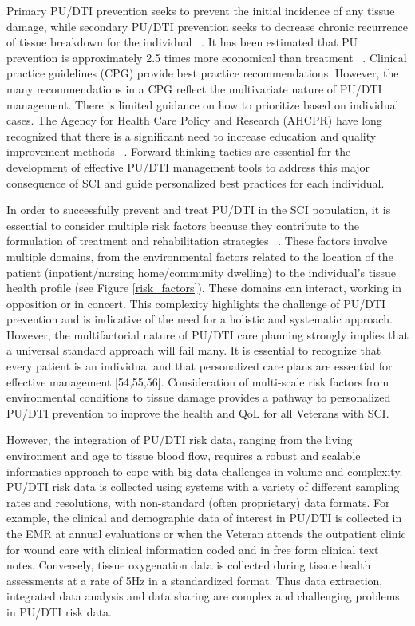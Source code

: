 \documentclass{amia}
\begin{document}
Primary PU/DTI prevention seeks to prevent the initial incidence of any tissue damage, while secondary PU/DTI prevention seeks to decrease chronic recurrence of tissue breakdown for the individual ~\cite{ref7}. It has been estimated that PU prevention is approximately 2.5 times more economical than treatment ~\cite{ref8}. Clinical practice guidelines (CPG) provide best practice recommendations. However, the many recommendations in a CPG reflect the multivariate nature of PU/DTI management. There is limited guidance on how to prioritize based on individual cases. The Agency for Health Care Policy and Research (AHCPR) have long recognized that there is a significant need to increase education and quality improvement methods ~\cite{ref9}. Forward thinking tactics are essential for the development of effective PU/DTI management tools to address this major consequence of SCI and guide personalized best practices for each individual.

In order to successfully prevent and treat PU/DTI in the SCI population, it is essential to consider multiple risk factors because they contribute to the formulation of treatment and rehabilitation strategies ~\cite{ref10}. These factors involve multiple domains, from the environmental factors related to the location of the patient (inpatient/nursing home/community dwelling) to the individual’s tissue health profile (see Figure \ref{risk_factors}). These domains can interact, working in opposition or in concert. This complexity highlights the challenge of PU/DTI prevention and is indicative of the need for a holistic and systematic approach. However, the multifactorial nature of PU/DTI care planning strongly implies that a universal standard approach will fail many. It is essential to recognize that every patient is an individual and that personalized care plans are essential for effective management [54,55,56]. Consideration of multi-scale risk factors from environmental conditions to tissue damage provides a pathway to personalized PU/DTI prevention to improve the health and QoL for all Veterans with SCI.

However, the integration of PU/DTI risk data, ranging from the living environment and age to tissue blood flow, requires a robust and scalable informatics approach to cope with big-data challenges in volume and complexity. PU/DTI risk data is collected using systems with a variety of different sampling rates and resolutions, with non-standard (often proprietary) data formats. For example, the clinical and demographic data of interest in PU/DTI is collected in the EMR at annual evaluations or when the Veteran attends the outpatient clinic for wound care with clinical information coded and in free form clinical text notes. Conversely, tissue oxygenation data is collected during tissue health assessments at a rate of 5Hz in a standardized format. Thus data extraction, integrated data analysis and data sharing are complex and challenging problems in PU/DTI risk data.
\end{document}
